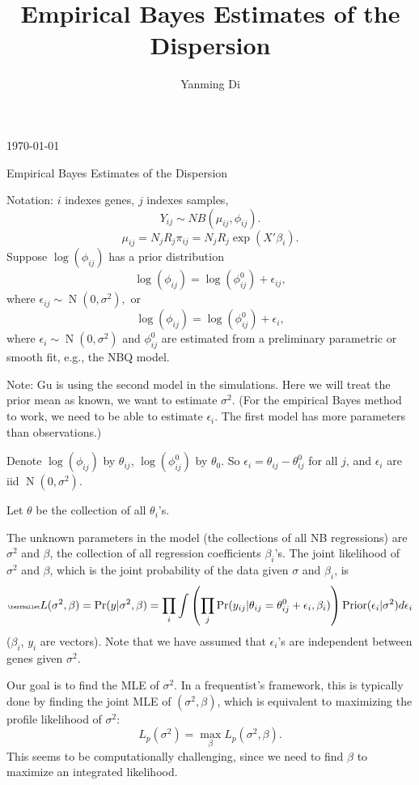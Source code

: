 \documentclass[letterpaper, 12pt]{article}
\title{Empirical Bayes Estimates of the Dispersion}
\author{Yanming Di}
\DeclareMathOperator{\N}{N}
\DeclareMathOperator{\prior}{Prior}
\renewcommand{\Pr}{\mathop{\mathrm{Pr}}\nolimits}
\begin{document}

\today

\begin{center}
{\Large
Empirical Bayes Estimates of the Dispersion
}
\end{center}

Notation: $i$ indexes genes, $j$ indexes samples,
\[ Y_{ij} \sim NB(\mu_{ij}, \phi_{ij}). \]
\[ \mu_{ij} = N_{j} R_{j} \pi_{ij} = N_{j} R_{j} \exp(X' \beta_i). \]
Suppose $\log(\phi_{ij})$ has a prior distribution
\[ \log(\phi_{ij}) = \log(\phi_{ij}^{0}) + \epsilon_{ij}, \]
where $\epsilon_{ij} \sim \N(0, \sigma^2),$
or
\[ \log(\phi_{ij}) = \log(\phi_{ij}^{0}) + \epsilon_i, \]
where $\epsilon_i \sim \N(0, \sigma^2)$ and $\phi_{ij}^{0}$ are estimated from
a preliminary parametric or smooth fit, e.g., the NBQ model.

Note: Gu is using the second model in the simulations. Here we will treat the prior
mean as known, we want to estimate $\sigma^2$.  (For the empirical Bayes
method to work, we need to be able to estimate $\epsilon_i$. The first model
has more parameters than observations.)

\newpage
Denote $\log(\phi_{ij})$ by $\theta_{ij}$, $\log(\phi_{ij}^0)$ by $\theta_0$.
So $\epsilon_i = \theta_{ij} - \theta_{ij}^0$ for all $j$, and $\epsilon_i$
are iid $\N(0, \sigma^2)$.

Let $\theta$ be the collection of all $\theta_{i}$'s.


The unknown parameters in the model (the collections of all NB regressions)
are $\sigma^2$ and $\beta$, the collection of all regression coefficients
$\beta_i$'s.
The joint likelihood of $\sigma^2$ and $\beta$,  which is the joint probability of the
data given $\sigma$ and $\beta_i$, is
\begin{equation}
\begin{tiny}
•
\end{tiny}    \label{eq:likelihood0}
 L(\sigma^2, \beta) = \Pr(y | \sigma^2, \beta) = \prod_i \int \left( \prod_j \Pr(y_{ij} |
\theta_{ij}=\theta_{ij}^0+\epsilon_i, \beta_i) \right)
\prior(\epsilon_i|\sigma^2) d\epsilon_i
\end{equation}
($\beta_i$, $y_i$ are vectors). Note that we have assumed that $\epsilon_i$'s
are independent between genes given $\sigma^2$.

Our goal is to find the MLE of $\sigma^2$. In a frequentist's framework, this
is typically done by finding the joint MLE of $(\sigma^2, \beta)$, which is
equivalent to maximizing the profile likelihood of $\sigma^2$:
\begin{equation}
    \label{eq:likelihood1}
L_p(\sigma^2) = \max_{\beta} L_p(\sigma^2, \beta).
\end{equation}
This seems to be computationally challenging, since we need to find
$\beta$ to maximize an integrated likelihood.
\end{document}
